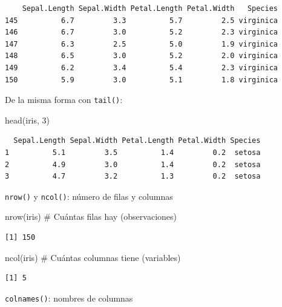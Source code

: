 \documentclass[
  letterpaper,
  DIV=11,
  numbers=noendperiod,
  twoside]{scrreprt}
\newenvironment{Shaded}{\begin{snugshade}}{\end{snugshade}}
\newcommand{\CommentTok}[1]{\textcolor[rgb]{0.37,0.37,0.37}{#1}}
\newcommand{\DecValTok}[1]{\textcolor[rgb]{0.68,0.00,0.00}{#1}}
\newcommand{\FunctionTok}[1]{\textcolor[rgb]{0.28,0.35,0.67}{#1}}
\newcommand{\NormalTok}[1]{\textcolor[rgb]{0.00,0.23,0.31}{#1}}
\begin{document}
\begin{verbatim}
    Sepal.Length Sepal.Width Petal.Length Petal.Width   Species
145          6.7         3.3          5.7         2.5 virginica
146          6.7         3.0          5.2         2.3 virginica
147          6.3         2.5          5.0         1.9 virginica
148          6.5         3.0          5.2         2.0 virginica
149          6.2         3.4          5.4         2.3 virginica
150          5.9         3.0          5.1         1.8 virginica
\end{verbatim}

De la misma forma con \texttt{tail()}:

\begin{Shaded}
\begin{Highlighting}[]
\FunctionTok{head}\NormalTok{(iris, }\DecValTok{3}\NormalTok{)}
\end{Highlighting}
\end{Shaded}

\begin{verbatim}
  Sepal.Length Sepal.Width Petal.Length Petal.Width Species
1          5.1         3.5          1.4         0.2  setosa
2          4.9         3.0          1.4         0.2  setosa
3          4.7         3.2          1.3         0.2  setosa
\end{verbatim}

\texttt{nrow()} y \texttt{ncol()}: número de filas y columnas

\begin{Shaded}
\begin{Highlighting}[]
\FunctionTok{nrow}\NormalTok{(iris)   }\CommentTok{\# Cuántas filas hay (observaciones)}
\end{Highlighting}
\end{Shaded}

\begin{verbatim}
[1] 150
\end{verbatim}

\begin{Shaded}
\begin{Highlighting}[]
\FunctionTok{ncol}\NormalTok{(iris)   }\CommentTok{\# Cuántas columnas tiene (variables)}
\end{Highlighting}
\end{Shaded}

\begin{verbatim}
[1] 5
\end{verbatim}

\texttt{colnames()}: nombres de columnas
\end{document}

